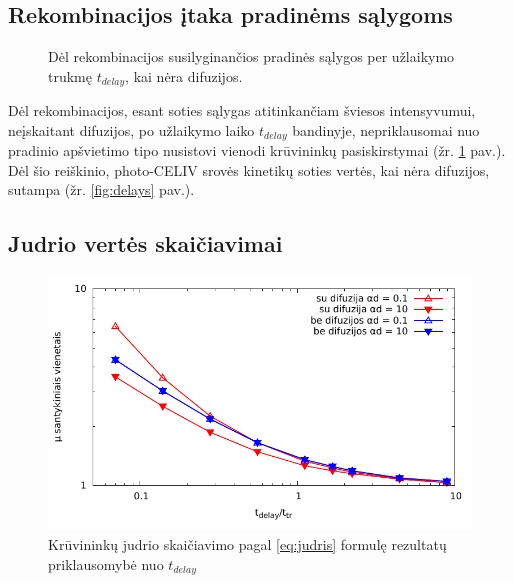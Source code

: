 \subsection{Rekombinacijos įtaka pradinėms sąlygoms}
\begin{figure}[H]
  \centering
  \caption{Dėl rekombinacijos susilyginančios pradinės sąlygos per užlaikymo trukmę $t_{delay}$, kai nėra difuzijos.}
  \label{fig:recomb}
\end{figure}

Dėl rekombinacijos, esant soties sąlygas atitinkančiam šviesos intensyvumui, neįskaitant difuzijos, po užlaikymo laiko $t_{delay}$ bandinyje, nepriklausomai nuo pradinio apšvietimo tipo nusistovi vienodi krūvininkų pasiskirstymai (žr. \ref{fig:recomb} pav.).
Dėl šio reiškinio, photo-CELIV srovės kinetikų soties vertės, kai nėra difuzijos, sutampa (žr. \ref{fig:delays} pav.).

\subsection{Judrio vertės skaičiavimai}

\begin{figure}[htb]
  \centering
	\includegraphics{./media/pdf/log_mobility.pdf}
  \caption{Krūvininkų judrio skaičiavimo pagal \eqref{eq:judris} formulę rezultatų priklausomybė nuo $t_{delay}$}
  \label{fig:mobility}
\end{figure}

